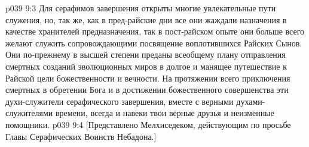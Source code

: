 \vs p039 9:3 Для серафимов завершения открыты многие увлекательные пути служения, но, так же, как в пред\hyp{}райские дни все они жаждали назначения в качестве хранителей предназначения, так в пост\hyp{}райском опыте они больше всего желают служить сопровождающими посвящение воплотившихся Райских Сынов. Они по\hyp{}прежнему в высшей степени преданы всеобщему плану отправления смертных созданий эволюционных миров в долгое и манящее путешествие к Райской цели божественности и вечности. На протяжении всего приключения смертных в обретении Бога и в достижении божественного совершенства эти духи\hyp{}служители серафического завершения, вместе с верными духами\hyp{}служителями времени, всегда и навеки твои верные друзья и неизменные помощники.
\vsetoff
\vs p039 9:4 [Представлено Мелхиседеком, действующим по просьбе Главы Серафических Воинств Небадона.]
\quizlink

